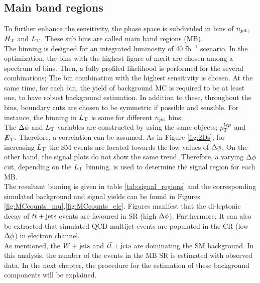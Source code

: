 \subsection{Main band regions}
To further enhance the sensitivity, the phase space is subdivided in bins of $n_{\rm jet}$, $H_{\rm T}$ and $L_{\rm T}$. These sub bins are called main band regions (MB). \\
The binning is designed for an integrated luminosity of 40 fb$^{-1}$ scenario. In the optimization, the bins with the highest figure of merit are chosen among a spectrum of bins. Then, a fully profiled likelihood is performed for the several combinations; The bin combination with the highest sensitivity is chosen. At the same time, for each bin, the yield of background MC is required to be at least one, to have robust background estimation. In addition to these, throughout the bins, boundary cuts are chosen to be symmetric if possible and sensible. For instance, the binning in $L_{\rm T}$ is same for different $n_{\rm jet}$ bins.\\
The $\Delta \phi$ and $L_{\rm T}$ variables are constructed by using the same objects; $p_T^{lep}$ and $\slashed{E}_T$. Therefore, a correlation can be assumed. As in Figure \ref{fig:2Ds}, for increasing $L_{\rm T}$ the SM events are located towards the low values of $\Delta \phi$. On the other hand, the signal plots do not show the same trend. Therefore, a varying $\Delta \phi$  cut, depending on the $L_{\rm T}$ binning, is used to determine the signal region for each MB. \\
The resultant binning is given in table \ref{tab:signal_regions} and the corresponding simulated background and signal yields can be found in Figures \ref{fig:MCcounts_mu},\ref{fig:MCcounts_ele}. Figures manifest that the di-leptonic decay of $t\bar{t}+\textrm{jets}$ events are favoured in SR (high $\Delta \phi$).
Furthermore, It can also be extracted that simulated QCD multijet events are populated in the CR (low $\Delta \phi$) in electron channel.\\
As mentioned, the $W+\textrm{jets}$ and $t\bar{t}+\textrm{jets}$ are dominating the SM background. In this analysis, the number of the events in the MB SR is estimated with observed data. In the next chapter, the procedure for the estimation of these background components will be explained. \\ 
